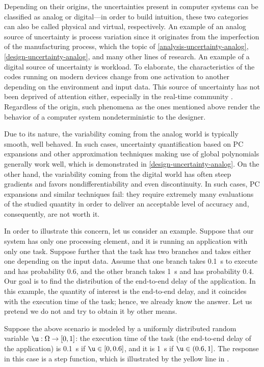 Depending on their origins, the uncertainties present in computer systems can be
classified as analog or digital---in order to build intuition, these two
categories can also be called physical and virtual, respectively. An example of
an analog source of uncertainty is process variation since it originates from
the imperfection of the manufacturing process, which the topic of
\cref{analysis-uncertainty-analog}, \cref{design-uncertainty-analog}, and many
other lines of research. An example of a digital source of uncertainty is
workload. To elaborate, the characteristics of the codes running on modern
devices change from one activation to another depending on the environment and
input data. This source of uncertainty has not been deprived of attention
either, especially in the real-time community \cite{quinton2012, diaz2002,
santinelli2011, tanasa2015}. Regardless of the origin, such phenomena as the
ones mentioned above render the behavior of a computer system nondeterministic
to the designer.

Due to its nature, the variability coming from the analog world is typically
smooth, well behaved. In such cases, uncertainty quantification based on
\acf{PC} expansions \cite{xiu2010} and other approximation techniques making use
of global polynomials generally work well, which is demonstrated in
\cref{design-uncertainty-analog}. On the other hand, the variability coming from
the digital world has often steep gradients and favors nondifferentiability and
even discontinuity. In such cases, \ac{PC} expansions and similar techniques
fail: they require extremely many evaluations of the studied quantity in order
to deliver an acceptable level of accuracy and, consequently, are not worth it.

In order to illustrate this concern, let us consider an example. Suppose that
our system has only one processing element, and it is running an application
with only one task. Suppose further that the task has two branches and takes
either one depending on the input data. Assume that one branch takes 0.1~s to
execute and has probability 0.6, and the other branch takes 1~s and has
probability 0.4. Our goal is to find the distribution of the end-to-end delay of
the application. In this example, the quantity of interest is the end-to-end
delay, and it coincides with the execution time of the task; hence, we already
know the answer. Let us pretend we do not and try to obtain it by other means.

Suppose the above scenario is modeled by a uniformly distributed random variable
$\u: \Omega \to [0, 1]$: the execution time of the task (the end-to-end delay of
the application) is 0.1~s if $\u \in [0, 0.6]$, and it is 1~s if $\u \in (0.6,
1]$. The response in this case is a step function, which is illustrated by the
yellow line in .

